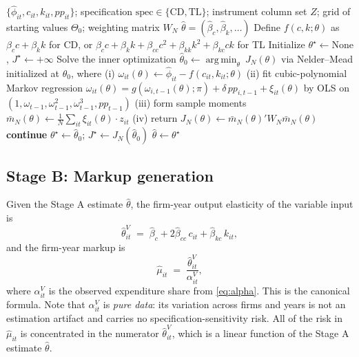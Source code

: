 \documentclass[11pt]{article}
\DeclareMathOperator*{\argmin}{arg\,min}
\begin{document}
\begin{algorithm}[htbp]
\caption{Stage A --- Production-function GMM with KLS reseeding}\label{alg:stage_a}
\begin{algorithmic}[1]
\INPUT $\{\hat\phi_{it}, c_{it}, k_{it}, pp_{it}\}$; specification $\text{spec}\in\{\mathrm{CD},\mathrm{TL}\}$; instrument column set $Z$; grid of starting values $\Theta_0$; weighting matrix $W_N$
\OUTPUT $\hat\theta = (\hat\beta_c,\hat\beta_k,\ldots)$
\State Define $f(c,k;\theta)$ as $\beta_c c + \beta_k k$ for CD, or $\beta_c c + \beta_k k + \beta_{cc}c^2 + \beta_{kk}k^2 + \beta_{kc}ck$ for TL
\State Initialize $\theta^\star \gets \text{None}$, $J^\star \gets +\infty$
    \State Solve the inner optimization
    $\hat\theta_{0} \gets \argmin_\theta\ J_N(\theta)$
    via Nelder--Mead initialized at $\theta_0$, where
    \Statex \hspace{\algorithmicindent} (i) $\omega_{it}(\theta) \gets \hat\phi_{it} - f(c_{it},k_{it};\theta)$
    \Statex \hspace{\algorithmicindent} (ii) fit cubic-polynomial Markov regression $\omega_{it}(\theta) = g(\omega_{i,t-1}(\theta);\pi) + \delta\, pp_{i,t-1} + \xi_{it}(\theta)$ by OLS on $(1,\omega_{t-1},\omega_{t-1}^2,\omega_{t-1}^3,pp_{t-1})$
    \Statex \hspace{\algorithmicindent} (iii) form sample moments $\bar m_N(\theta) \gets \frac{1}{N}\sum_{it}\xi_{it}(\theta)\cdot z_{it}$
    \Statex \hspace{\algorithmicindent} (iv) return $J_N(\theta) \gets \bar m_N(\theta)' W_N \bar m_N(\theta)$
     
        \State \textbf{continue}
    \EndIf
        \State $\theta^\star \gets \hat\theta_0$; $J^\star \gets J_N(\hat\theta_0)$
    \EndIf
\EndFor
\State \Return $\hat\theta \gets \theta^\star$
\end{algorithmic}
\end{algorithm}

\subsection{Stage B: Markup generation}

Given the Stage A estimate $\hat\theta$, the firm-year output elasticity of the variable input is
\begin{equation}\label{eq:theta_v}
\hat\theta^V_{it} \;=\; \hat\beta_c + 2\hat\beta_{cc}\, c_{it} + \hat\beta_{kc}\, k_{it},
\end{equation}
and the firm-year markup is
\begin{equation}\label{eq:mu}
\hat\mu_{it} \;=\; \frac{\hat\theta^V_{it}}{\alpha^V_{it}},
\end{equation}
where $\alpha^V_{it}$ is the observed expenditure share from \eqref{eq:alpha}. This is the canonical \citet{DLW2012} formula. Note that $\alpha^V_{it}$ is \emph{pure data}: its variation across firms and years is not an estimation artifact and carries no specification-sensitivity risk. All of the risk in $\hat\mu_{it}$ is concentrated in the numerator $\hat\theta^V_{it}$, which is a linear function of the Stage A estimate $\hat\theta$.
\end{document}
